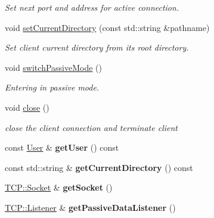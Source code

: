 \begin{DoxyCompactItemize}
\begin{DoxyCompactList}\small\item\em Set next port and address for active connection. \end{DoxyCompactList}\item 
void \hyperlink{class_f_t_p_1_1_client_a545b1a0a22f36391a6ee8f8563012fa6}{set\-Current\-Directory} (const std\-::string \&pathname)
\begin{DoxyCompactList}\small\item\em Set client current directory from its root directory. \end{DoxyCompactList}\item 
\hypertarget{class_f_t_p_1_1_client_a57cd373e14fbd270455df91ddf0ac0e7}{void \hyperlink{class_f_t_p_1_1_client_a57cd373e14fbd270455df91ddf0ac0e7}{switch\-Passive\-Mode} ()}\label{class_f_t_p_1_1_client_a57cd373e14fbd270455df91ddf0ac0e7}

\begin{DoxyCompactList}\small\item\em Entering in passive mode. \end{DoxyCompactList}\item 
\hypertarget{class_f_t_p_1_1_client_a78f23a9b26bbf98f9fb9b266552d94bb}{void \hyperlink{class_f_t_p_1_1_client_a78f23a9b26bbf98f9fb9b266552d94bb}{close} ()}\label{class_f_t_p_1_1_client_a78f23a9b26bbf98f9fb9b266552d94bb}

\begin{DoxyCompactList}\small\item\em close the client connection and terminate client \end{DoxyCompactList}\item 
\hypertarget{class_f_t_p_1_1_client_abf9b8beac9e9769c78244de4406451d6}{const \hyperlink{struct_f_t_p_1_1_user}{User} \& {\bfseries get\-User} () const }\label{class_f_t_p_1_1_client_abf9b8beac9e9769c78244de4406451d6}

\item 
\hypertarget{class_f_t_p_1_1_client_ab5f9b53875bb0847045e056a8f9f8073}{const std\-::string \& {\bfseries get\-Current\-Directory} () const }\label{class_f_t_p_1_1_client_ab5f9b53875bb0847045e056a8f9f8073}

\item 
\hypertarget{class_f_t_p_1_1_client_a285e48c50c37c7dd7832a3731182b362}{\hyperlink{class_f_t_p_1_1_t_c_p_1_1_socket}{T\-C\-P\-::\-Socket} \& {\bfseries get\-Socket} ()}\label{class_f_t_p_1_1_client_a285e48c50c37c7dd7832a3731182b362}

\item 
\hypertarget{class_f_t_p_1_1_client_add44878cec59e5f08b68504e0756a87e}{\hyperlink{class_f_t_p_1_1_t_c_p_1_1_listener}{T\-C\-P\-::\-Listener} \& {\bfseries get\-Passive\-Data\-Listener} ()}\label{class_f_t_p_1_1_client_add44878cec59e5f08b68504e0756a87e}

\end{DoxyCompactItemize}


